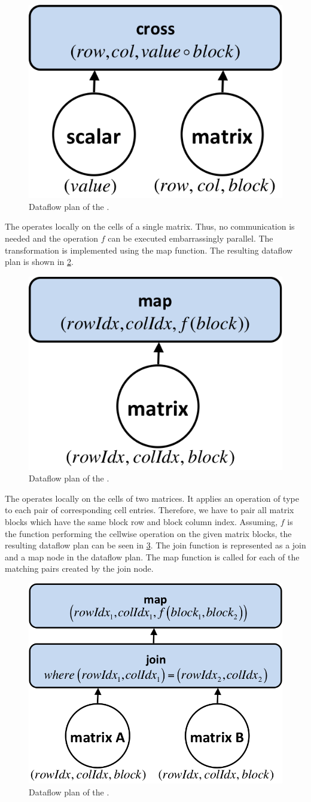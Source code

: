\begin{figure}[!h]
	\centering
	\includegraphics[width=0.25\linewidth]{images/planScalarMatrixTransformation.png}
	\caption{Dataflow plan of the .}
	\label{fig:planScalarMatrixTransformation}
\end{figure}

The  operates locally on the cells of a single matrix.
Thus, no communication is needed and the  operation $f$ can be executed embarrassingly parallel.
The transformation is implemented using the map function.
The resulting dataflow plan is shown in \cref{fig:planCellwiseMatrixTransformation}.

\begin{figure}[!h]
	\centering
	\includegraphics[width=0.25\linewidth]{images/planCellwiseMatrixTransformation.png}
	\caption{Dataflow plan of the .}
	\label{fig:planCellwiseMatrixTransformation}
\end{figure}

The  operates locally on the cells of two matrices.
It applies an operation of type  to each pair of corresponding cell entries.
Therefore, we have to pair all matrix blocks which have the same block row and block column index.
Assuming, $f$ is the function performing the cellwise operation on the given matrix blocks, the resulting dataflow plan can be seen in \cref{fig:planCellwiseMatrixMatrixTransformation}.
The join function is represented as a join and a map node in the dataflow plan.
The map function is called for each of the matching pairs created by the join node.

\begin{figure}[!h]
	\centering
	\includegraphics[width=0.365\linewidth]{images/planCellwiseMatrixMatrixTransformation.png}
	\caption{Dataflow plan of the .}
	\label{fig:planCellwiseMatrixMatrixTransformation}
\end{figure}

